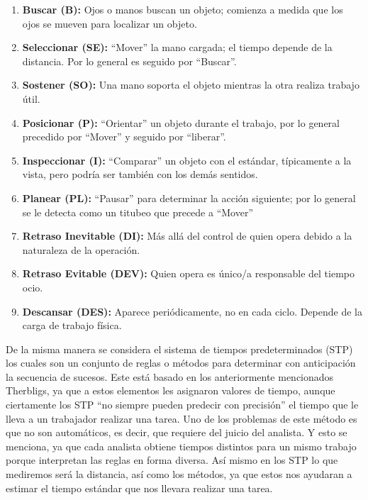 \begin{enumerate}
        \item \textbf{Buscar (B):} Ojos o manos buscan un objeto; comienza a medida que los ojos se mueven para localizar un objeto.
        \item \textbf{Seleccionar (SE):} “Mover” la mano cargada; el tiempo depende de la distancia. Por lo general es seguido por “Buscar”.
        \item \textbf{Sostener (SO):} Una mano soporta el objeto mientras la otra realiza trabajo útil.
        \item \textbf{Posicionar (P):} “Orientar” un objeto durante el trabajo, por lo general precedido por “Mover” y seguido por “liberar”.
        \item \textbf{Inspeccionar (I):} “Comparar” un objeto con el estándar, típicamente a la vista, pero podría ser también con los demás sentidos.
        \item \textbf{Planear (PL):} “Pausar” para determinar la acción siguiente; por lo general se le detecta como un titubeo que precede a “Mover”
        \item \textbf{Retraso Inevitable (DI):} Más allá del control de quien opera debido a la naturaleza de la operación.
        \item \textbf{Retraso Evitable (DEV):} Quien opera es único/a responsable del tiempo ocio.
        \item \textbf{Descansar (DES):} Aparece periódicamente, no en cada ciclo. Depende de la carga de trabajo física.
    
    \end{enumerate}
    
    De la misma manera se considera el sistema de tiempos predeterminados (STP) los cuales son un conjunto de reglas o métodos para determinar con anticipación la secuencia de sucesos. Este está basado en los anteriormente mencionados Therbligs, ya que a estos elementos les asignaron valores de tiempo, aunque ciertamente los STP “no siempre pueden predecir con precisión” el tiempo que le lleva a un trabajador realizar una tarea. Uno de los problemas de este método es que no son automáticos, es decir, que requiere del juicio del analista. Y esto se menciona, ya que cada analista obtiene tiempos distintos para un mismo trabajo porque interpretan las reglas en forma diversa. Así mismo en los STP lo que mediremos será la distancia, así como los métodos, ya que estos nos ayudaran a estimar el tiempo estándar que nos llevara realizar una tarea. 
    
    
    
